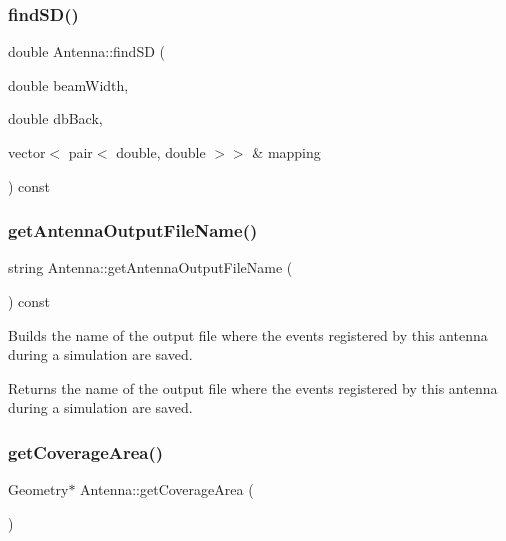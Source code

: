 \mbox{\label{class_antenna_affb34fcbb958e09bd48a2c3069e06ac8}} 
\subsubsection{\texorpdfstring{find\+S\+D()}{findSD()}}
{\footnotesize\ttfamily double Antenna\+::find\+SD (\begin{DoxyParamCaption}\item[{double}]{beam\+Width,  }\item[{double}]{db\+Back,  }\item[{vector$<$ pair$<$ double, double $>$$>$ \&}]{mapping }\end{DoxyParamCaption}) const\hspace{0.3cm}{\ttfamily [private]}}

\mbox{\label{class_antenna_a7a3919b137b91c1f8f13d620bc7657ed}} 
\subsubsection{\texorpdfstring{get\+Antenna\+Output\+File\+Name()}{getAntennaOutputFileName()}}
{\footnotesize\ttfamily string Antenna\+::get\+Antenna\+Output\+File\+Name (\begin{DoxyParamCaption}{ }\end{DoxyParamCaption}) const}

Builds the name of the output file where the events registered by this antenna during a simulation are saved. \begin{DoxyReturn}{Returns}
the name of the output file where the events registered by this antenna during a simulation are saved. 
\end{DoxyReturn}
\mbox{\label{class_antenna_a5f94dd903add1b59957514887388bd52}} 
\subsubsection{\texorpdfstring{get\+Coverage\+Area()}{getCoverageArea()}}
{\footnotesize\ttfamily Geometry$\ast$ Antenna\+::get\+Coverage\+Area (\begin{DoxyParamCaption}{ }\end{DoxyParamCaption})\hspace{0.3cm}{\ttfamily [private]}}


